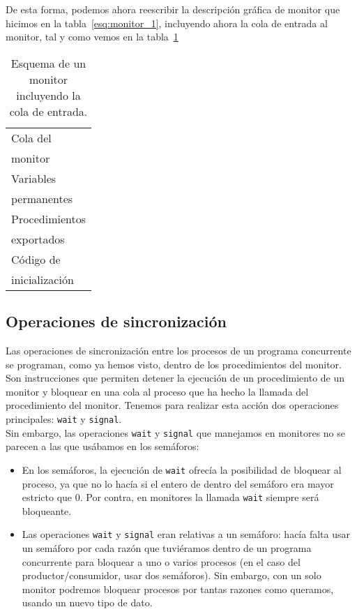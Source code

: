 De esta forma, podemos ahora reescribir la descripción gráfica de monitor que hicimos en la tabla~\ref{esq:monitor_1}, incluyendo ahora la cola de entrada al monitor, tal y como vemos en la tabla~\ref{esq:monitor_2}
\begin{table}[H]
\centering
\begin{tabular}{|l|}
\hline
Cola del\\
monitor \\
\hline
Variables \\
permanentes \\
\hline
Procedimientos \\
exportados \\
\hline
Código de \\ 
inicialización \\
\hline
\end{tabular}
\caption{Esquema de un monitor incluyendo la cola de entrada.}
\label{esq:monitor_2}
\end{table}

\subsection{Operaciones de sincronización}
Las operaciones de sincronización entre los procesos de un programa concurrente se programan, como ya hemos visto, dentro de los procedimientos del monitor. Son instrucciones que permiten detener la ejecución de un procedimiento de un monitor y bloquear en una cola al proceso que ha hecho la llamada del procedimiento del monitor. Tenemos para realizar esta acción dos operaciones principales: \verb|wait| y \verb|signal|.\\

Sin embargo, las operaciones \verb|wait| y \verb|signal| que manejamos en monitores no se parecen a las que usábamos en los semáforos:
\begin{itemize}
    \item En los semáforos, la ejecución de \verb|wait| ofrecía la posibilidad de bloquear al proceso, ya que no lo hacía si el entero de dentro del semáforo era mayor estricto que $0$. Por contra, en monitores la llamada \verb|wait| siempre será bloqueante.
    \item Las operaciones \verb|wait| y \verb|signal| eran relativas a un semáforo: hacía falta usar un semáforo por cada razón que tuviéramos dentro de un programa concurrente para bloquear a uno o varios procesos (en el caso del productor/consumidor, usar dos semáforos). Sin embargo, con un solo monitor podremos bloquear procesos por tantas razones como queramos, usando un nuevo tipo de dato.
\end{itemize}

